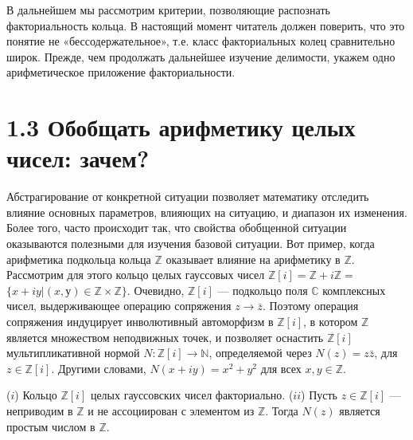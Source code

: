 \documentclass{../../template/mai_book}
\begin{document}
В дальнейшем мы рассмотрим критерии, позволяющие распознать факториальность кольца. В настоящий момент читатель должен пове­рить, что это понятие не «бессодержательное», т.е. класс факториаль­ных колец сравнительно широк. Прежде, чем продолжать дальнейшее изучение делимости, укажем одно арифметическое приложение факториальности.

\newpage

\section{\large 1.3 Обобщать арифметику целых чисел: зачем?}

\noindent Абстрагирование от конкретной ситуации позволяет математику отследить влияние основных параметров, влияющих на ситуацию, и диапазон их изменения. Более того, часто происходит так, что свойства обобщенной ситуации оказываются полезными для изучения базовой ситуации. Вот пример, когда арифметика подкольца кольца $\mathds{Z}$ оказывает влияние на арифметику в $\mathds{Z}$.
\newline \indent Рассмотрим для этого кольцо целых гауссовых чисел $\mathds{Z}[i] = \mathds{Z} + i\mathds{Z} =$\newline $\{x + iy | (x, у) \in \mathds{Z} \times \mathds{Z}\}$. Очевидно, $\mathds{Z}[i]$ — подкольцо поля $\mathds{C}$ комплексных чисел, выдерживающее операцию сопряжения $z \rightarrow \bar{z}$. Поэтому операция сопряжения индуцирует инволютивный автоморфизм в $\mathds{Z}[i]$, в котором $\mathds{Z}$ является множеством неподвижных точек, и позволяет оснастить $\mathds{Z}[i]$ мультипликативной нормой $N : \mathds{Z}[i] \rightarrow \mathds{N}$, определяемой через $N(z) = z\bar{z}$, для $z \in \mathds{Z}[i]$. Другими словами, $N(x + iy) = x^2 + y^2 $ для всех $x , y \in \mathds{Z}$.

\begin{predl}
\textit{\indent} ($i$) Кольцо $\mathds{Z}[i]$ целых гауссовских чисел факториально. 
\newline \indent($ii$)  Пусть $z \in \mathds{Z}[i]$ — неприводим в $\mathds{Z}$ и не ассоциирован с элементом из $\mathds{Z}$. Тогда $N(z)$ является простым числом в $\mathds{Z}$.
\end{predl}
\end{document}
